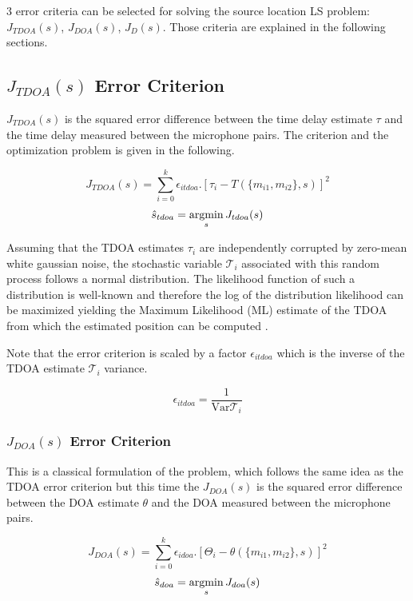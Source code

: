 3 error criteria can be selected for solving the source location LS problem:  $J_{TDOA}(s)$, $J_{DOA}(s)$, $J_{D}(s)$. Those criteria are explained in the following sections.

\subsection{$J_{TDOA}(s)$ Error Criterion}

$J_{TDOA}(s)$ is the squared error difference between the time delay estimate $\tau$ and the time delay measured between the microphone pairs. The criterion and the optimization problem is given in the following.

\begin{equation}
J_{TDOA}(s) = {\sum}_{i=0}^k \epsilon_{itdoa}.[\tau_{i}-T(\{m_{i1},m_{i2}\},s)]^2
\label{eq:jtdoa}
\end{equation}
\begin{equation}
\hat{s}_{tdoa}= \argmin_{s} J_{tdoa}(s) 
\end{equation}

Assuming that the TDOA estimates $\tau_{i}$ are independently corrupted by zero-mean white gaussian noise, the stochastic variable $\mathcal{T}_{i}$ associated with this random process follows a normal distribution. The likelihood function of such a distribution is well-known and therefore the log of the distribution likelihood can be maximized yielding the Maximum Likelihood (ML) estimate of the TDOA from which the estimated position can be computed . 

Note that the error criterion is scaled by a factor $\epsilon_{itdoa}$ which is the inverse of the TDOA estimate $\mathcal{T}_{i}$ variance. 

\begin{equation}
\epsilon_{itdoa}=\frac{1}{\mathrm{Var}{\mathcal{T}_{i}}}
\label{eq:epsilonjtdoa}
\end{equation}

\subsubsection{$J_{DOA}(s)$ Error Criterion}

This is a classical formulation of the problem, which follows the same idea as the TDOA error criterion but this time the $J_{DOA}(s)$ is the squared error difference between the DOA estimate $\theta$ and the DOA measured between the microphone pairs. 

\begin{equation}
J_{DOA}(s) = {\sum}_{i=0}^k \epsilon_{idoa}.[\Theta_{i}-\theta(\{m_{i1},m_{i2}\},s)]^2
\label{eq:jdoa}
\end{equation}
\begin{equation}
\hat{s}_{doa}= \argmin_{s} J_{doa}(s) 
\end{equation}


